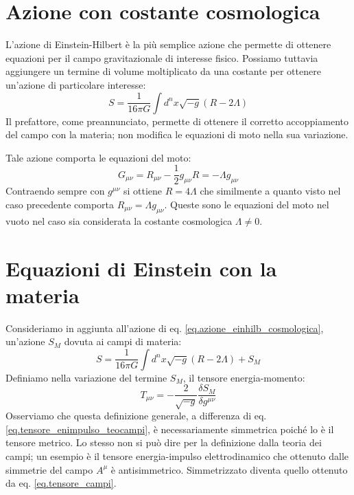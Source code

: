 \section{Azione con costante cosmologica}
L'azione di Einstein-Hilbert è la più semplice azione che permette di ottenere equazioni per il campo gravitazionale di interesse fisico. Possiamo tuttavia aggiungere un termine di volume moltiplicato da una costante per ottenere un'azione di particolare interesse:
\begin{equation}
    S = \frac{1}{16\pi G} \int d^n x \sqrt{-g}(R- 2\Lambda)
    \label{eq.azione_einhilb_cosmologica}
\end{equation}
Il prefattore, come preannunciato, permette di ottenere il corretto accoppiamento del campo con la materia; non modifica le equazioni di moto nella sua variazione.

Tale azione comporta le equazioni del moto:
\begin{equation*}
  G_{\mu\nu} =  R_{\mu\nu} - \frac{1}{2}g_{\mu\nu} R  = - \Lambda g_{\mu\nu}
\end{equation*}
Contraendo sempre con $g^{\mu\nu}$ si ottiene $R = 4\Lambda$ che similmente a quanto visto nel caso precedente comporta $R_{\mu\nu} = \Lambda g_{\mu\nu}$.
Queste sono le equazioni del moto nel vuoto nel caso sia considerata la costante cosmologica $\Lambda \neq 0$.

\section{Equazioni di Einstein con la materia}
Consideriamo in aggiunta all'azione di eq. \ref{eq.azione_einhilb_cosmologica}, un'azione $S_M$ dovuta ai campi di materia:
\begin{equation*}
    S = \frac{1}{16\pi G} \int d^nx \sqrt{-g}(R- 2\Lambda) + S_M
\end{equation*}
Definiamo nella variazione del termine $S_M$, il tensore energia-momento:
\begin{equation}
    T_{\mu\nu} = - \frac{2}{\sqrt{-g}}\frac{\delta S_M}{\delta g^{\mu\nu}}
    \label{eq.tensore_campi}
\end{equation}
Osserviamo che questa definizione generale, a differenza di eq. \ref{eq.tensore_enimpulso_teocampi}, è necessariamente simmetrica poiché lo è il tensore metrico. Lo stesso non si può dire per la definizione dalla teoria dei campi; un esempio è il tensore energia-impulso elettrodinamico che ottenuto dalle simmetrie del campo $A^\mu$ è antisimmetrico. Simmetrizzato diventa quello ottenuto da eq. \ref{eq.tensore_campi}.

